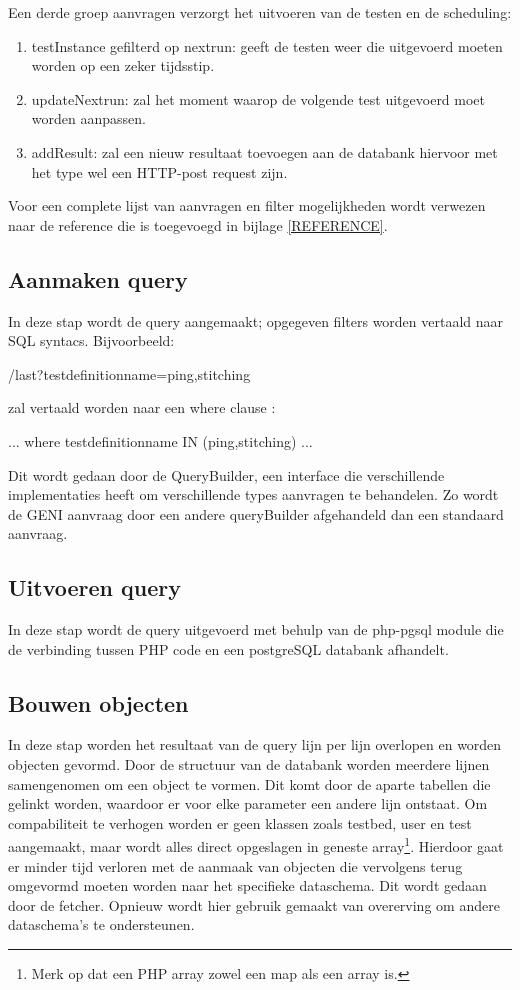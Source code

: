 \clearpage
Een derde groep aanvragen verzorgt het uitvoeren van de testen en de scheduling:
\begin{enumerate}
\item testInstance gefilterd op nextrun: geeft de testen weer die uitgevoerd moeten worden op een zeker tijdsstip.
\item updateNextrun: zal het moment waarop de volgende test uitgevoerd moet worden aanpassen.
\item addResult: zal een nieuw resultaat toevoegen aan de databank hiervoor met het type wel een HTTP-post request zijn.
\end{enumerate}
\npar
Voor een complete lijst van aanvragen en filter mogelijkheden wordt verwezen naar de reference die is toegevoegd in bijlage \ref{REFERENCE}.
\subsection{Aanmaken query}
\npar 
In deze stap wordt de query aangemaakt; opgegeven filters worden vertaald naar SQL syntacs. Bijvoorbeeld:
\begin{lt}
/last?testdefinitionname=ping,stitching
\end{lt}
zal vertaald worden naar een where clause :
\begin{lt}
... where testdefinitionname IN (ping,stitching) ...
\end{lt}
\npar
Dit wordt gedaan door de QueryBuilder, een interface die verschillende implementaties heeft om verschillende types aanvragen te behandelen. Zo wordt de GENI aanvraag door een andere queryBuilder afgehandeld dan een standaard aanvraag.

\subsection{Uitvoeren query}
\npar
In deze stap wordt de query uitgevoerd met behulp van de php-pgsql module die de verbinding tussen PHP code en een postgreSQL databank afhandelt.
\clearpage
\subsection{Bouwen objecten}
\npar
In deze stap worden het resultaat van de query lijn per lijn overlopen en worden objecten gevormd. Door de structuur van de databank worden meerdere lijnen samengenomen om een object te vormen. Dit komt door de aparte tabellen die gelinkt worden, waardoor er voor elke parameter een andere lijn ontstaat.
\npar
Om compabiliteit te verhogen worden er geen klassen zoals testbed, user en test aangemaakt, maar wordt alles direct opgeslagen in geneste array\footnote{Merk op dat een PHP array zowel een map als een array is.}. Hierdoor gaat er minder tijd verloren met de aanmaak van objecten die vervolgens terug omgevormd moeten worden naar het specifieke dataschema. Dit wordt gedaan door de fetcher. Opnieuw wordt hier gebruik gemaakt van overerving om andere dataschema's te ondersteunen.
